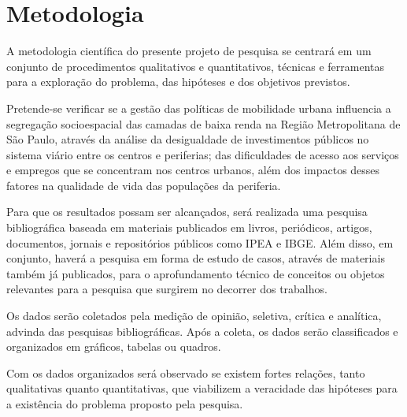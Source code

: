 \section{Metodologia}
A metodologia científica do presente projeto de pesquisa se centrará em um conjunto de procedimentos qualitativos e quantitativos, técnicas e ferramentas para a exploração do problema, das hipóteses e dos objetivos previstos. 

Pretende-se verificar se a gestão das políticas de mobilidade urbana influencia a segregação socioespacial das camadas de baixa renda na Região Metropolitana de São Paulo, através da análise da desigualdade de investimentos públicos no sistema viário entre os centros e periferias; das dificuldades de acesso aos serviços e empregos que se concentram nos centros urbanos, além dos impactos desses fatores na qualidade de vida das populações da periferia.

Para que os resultados possam ser alcançados, será realizada uma pesquisa bibliográfica baseada em materiais publicados em livros, periódicos, artigos, documentos, jornais e repositórios públicos como IPEA e IBGE. Além disso, em conjunto, haverá a pesquisa em forma de estudo de casos, através de materiais também já publicados, para o aprofundamento técnico de conceitos ou objetos relevantes para a pesquisa que surgirem no decorrer dos trabalhos. 

Os dados serão coletados pela medição de opinião, seletiva, crítica e analítica, advinda das pesquisas bibliográficas. Após a coleta, os dados serão classificados e organizados em gráficos, tabelas ou quadros.

Com os dados organizados será observado se existem fortes relações, tanto qualitativas quanto quantitativas, que viabilizem a veracidade das hipóteses para a existência do problema proposto pela pesquisa.
